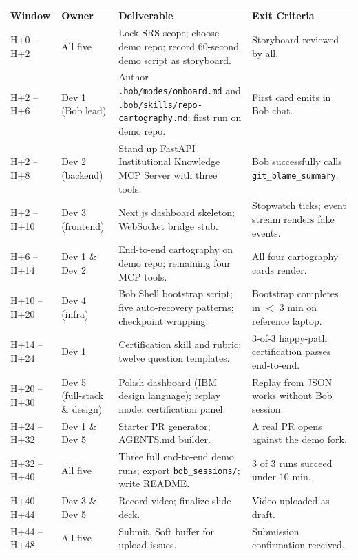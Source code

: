 \documentclass[11pt,letterpaper]{article}
\begin{document}
\begin{longtable}{|p{2.0cm}|p{2.8cm}|p{5cm}|p{4.6cm}|}
\hline
\textbf{Window} & \textbf{Owner} & \textbf{Deliverable} & \textbf{Exit Criteria} \\
\hline
H+0 \mbox{--} H+2 & All five & Lock SRS scope; choose demo repo; record 60-second demo script as storyboard. & Storyboard reviewed by all. \\
\hline
H+2 \mbox{--} H+6 & Dev 1 (Bob lead) & Author \texttt{.bob/modes/onboard.md} and \texttt{.bob/skills/repo-cartography.md}; first run on demo repo. & First card emits in Bob chat. \\
\hline
H+2 \mbox{--} H+8 & Dev 2 (backend) & Stand up FastAPI Institutional Knowledge MCP Server with three tools. & Bob successfully calls \texttt{git\_blame\_summary}. \\
\hline
H+2 \mbox{--} H+10 & Dev 3 (frontend) & Next.js dashboard skeleton; WebSocket bridge stub. & Stopwatch ticks; event stream renders fake events. \\
\hline
H+6 \mbox{--} H+14 & Dev 1 \& Dev 2 & End-to-end cartography on demo repo; remaining four MCP tools. & All four cartography cards render. \\
\hline
H+10 \mbox{--} H+20 & Dev 4 (infra) & Bob Shell bootstrap script; five auto-recovery patterns; checkpoint wrapping. & Bootstrap completes in $<$ 3 min on reference laptop. \\
\hline
H+14 \mbox{--} H+24 & Dev 1 & Certification skill and rubric; twelve question templates. & 3-of-3 happy-path certification passes end-to-end. \\
\hline
H+20 \mbox{--} H+30 & Dev 5 (full-stack \& design) & Polish dashboard (IBM design language); replay mode; certification panel. & Replay from JSON works without Bob session. \\
\hline
H+24 \mbox{--} H+32 & Dev 1 \& Dev 5 & Starter PR generator; AGENTS.md builder. & A real PR opens against the demo fork. \\
\hline
H+32 \mbox{--} H+40 & All five & Three full end-to-end demo runs; export \texttt{bob\_sessions/}; write README. & 3 of 3 runs succeed under 10 min. \\
\hline
H+40 \mbox{--} H+44 & Dev 3 \& Dev 5 & Record video; finalize slide deck. & Video uploaded as draft. \\
\hline
H+44 \mbox{--} H+48 & All five & Submit. Soft buffer for upload issues. & Submission confirmation received. \\
\hline
\end{longtable}
\end{document}
